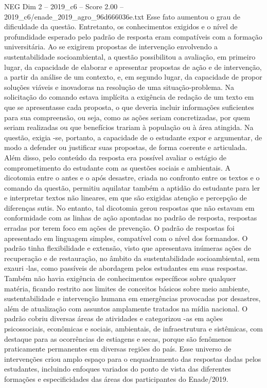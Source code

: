 \begin{textsample}{NEG Dim 2 – 2019\_c6 – Score 2.00 – 2019\_c6/enade\_2019\_agro\_96d666036e.txt}
Esse fato aumentou o grau de dificuldade da questão.
Entretanto, os conhecimentos exigidos e o nível de profundidade esperado pelo padrão de resposta eram compatíveis com a formação universitária.
Ao se exigirem propostas de intervenção envolvendo a sustentabilidade socioambiental, a questão possibilitou a avaliação, em primeiro lugar, da capacidade de elaborar e apresentar propostas de ação e de intervenção, a partir da análise de um contexto, e, em segundo lugar, da capacidade de propor soluções viáveis e inovadoras na resolução de uma situação-problema.
Na solicitação do comando estava implícita a exigência de redação de um texto em que se apresentasse cada proposta, o que deveria incluir informações suficientes para sua compreensão, ou seja, como as ações seriam concretizadas, por quem seriam realizadas ou que benefícios trariam à população ou à área atingida.
Na questão, exigia -se, portanto, a capacidade de o estudante expor e argumentar, de modo a defender ou justificar suas propostas, de forma coerente e articulada.
Além disso, pelo conteúdo da resposta era possível avaliar o estágio de comprometimento do estudante com as questões sociais e ambientais.
A dicotomia entre o antes e o após desastre, criada no confronto entre os textos e o comando da questão, permitiu aquilatar também a aptidão do estudante para ler e interpretar textos não lineares, em que são exigidas atenção e percepção de diferenças sutis.
No entanto, tal dicotomia gerou respostas que não estavam em conformidade com as linhas de ação apontadas no padrão de resposta, respostas erradas por terem foco em ações de prevenção.
O padrão de respostas foi apresentado em linguagem simples, compatível com o nível dos formandos.
O padrão tinha flexibilidade e extensão, visto que apresentava inúmeras ações de recuperação e de restauração, no âmbito da sustentabilidade socioambiental, sem exauri -las, como passíveis de abordagem pelos estudantes em suas respostas.
Também não havia exigência de conhecimentos específicos sobre qualquer matéria, ficando restrito aos limites de conceitos básicos sobre meio ambiente, sustentabilidade e intervenção humana em emergências provocadas por desastres, além de atualização com assuntos amplamente tratados na mídia nacional.
O padrão cobriu diversas áreas de atividades e categorizou -as em ações psicossociais, econômicas e sociais, ambientais, de infraestrutura e sistêmicas, com destaque para as ocorrências de estiagens e secas, porque são fenômenos praticamente permanentes em diversas regiões do país.
Esse universo de intervenções criou amplo espaço para o enquadramento das respostas dadas pelos estudantes, incluindo enfoques variados do ponto de vista das diferentes formações e especificidades das áreas dos participantes do Enade/2019.

\end{textsample}
